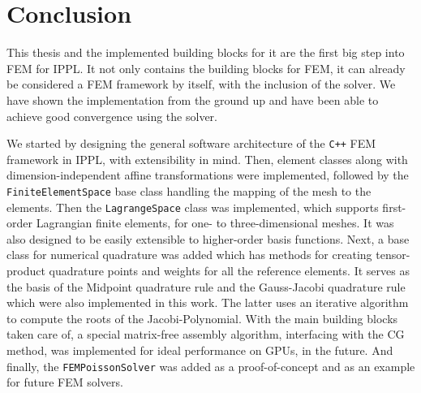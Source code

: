 \chapter{Conclusion}

This thesis and the implemented building blocks for it are the first big step into FEM
for IPPL. It not only contains the building blocks for FEM, it can already be considered a FEM
framework by itself, with the inclusion of the solver.
We have shown the implementation from the ground up and have been able to achieve good
convergence using the solver.


We started by designing the general software architecture of the \texttt{C++} FEM framework in IPPL,
with extensibility in mind.
Then, element classes along with dimension-independent affine transformations were implemented,
followed by the \texttt{FiniteElementSpace} base class handling the mapping of the mesh to the elements.
Then the \texttt{LagrangeSpace} class was implemented, which supports first-order Lagrangian finite elements,
for one- to three-dimensional meshes. It was also designed to be easily extensible to higher-order basis functions.
Next, a base class for numerical quadrature was added which has methods for creating
tensor-product quadrature points and weights for all the reference elements. It serves
as the basis of the Midpoint quadrature rule and the Gauss-Jacobi quadrature rule which were also implemented
in this work.
The latter uses an iterative algorithm to compute the roots of the Jacobi-Polynomial.
With the main building blocks taken care of, a special matrix-free assembly algorithm, interfacing with the CG method,
was implemented for ideal performance on GPUs, in the future.
And finally, the \texttt{FEMPoissonSolver} was added as a proof-of-concept and as an example
for future FEM solvers.

